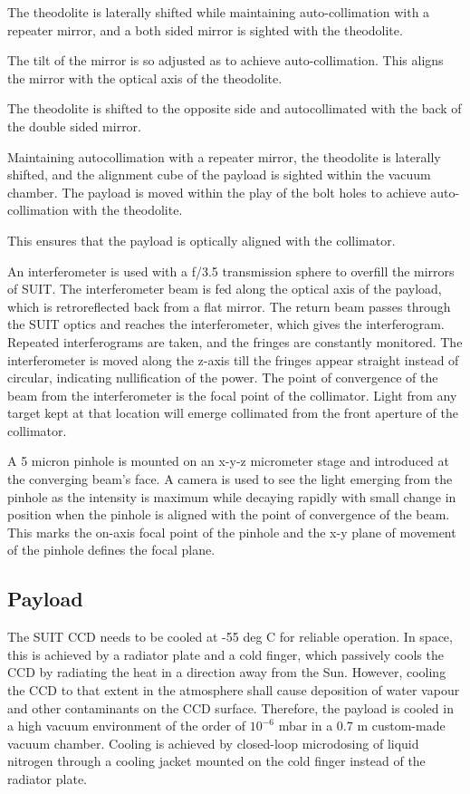 \documentclass[12pt]{spieman}  %
\begin{document}
	The theodolite is laterally shifted while maintaining auto-collimation with a repeater mirror, and a both sided mirror is sighted with the theodolite.
	
	The tilt of the mirror is so adjusted as to achieve auto-collimation. This aligns the mirror with the optical axis of the theodolite. 
	
	The theodolite is shifted to the opposite side and autocollimated with the back of the double sided mirror.
	
	Maintaining autocollimation with a repeater mirror, the theodolite is laterally shifted, and the alignment cube of the payload is sighted within the vacuum chamber. The payload is moved within the play of the bolt holes to achieve auto-collimation with the theodolite.
	
	This ensures that the payload is optically aligned with the collimator.
	
	An interferometer is used with a f/3.5 transmission sphere to overfill the mirrors of SUIT. The interferometer beam is fed along the optical axis of the payload, which is retroreflected back from a flat mirror. The return beam passes through the SUIT optics and reaches the interferometer, which gives the  interferogram. Repeated interferograms are taken, and the fringes are constantly monitored. The interferometer is moved along the z-axis till the fringes appear straight instead of circular, indicating nullification of the power. The point of convergence of the beam from the interferometer is the focal point of the collimator. Light from any target kept at that location will emerge collimated from the front aperture of the collimator. 
	
	A 5 micron pinhole is mounted on an x-y-z micrometer stage and introduced at the converging beam's face. A camera is used to see the light emerging from the pinhole as the intensity is maximum while decaying rapidly with small change in position when the pinhole is aligned with the point of convergence of the beam. This marks the on-axis focal point of the pinhole and the x-y plane of movement of the pinhole defines the focal plane.
	
	
	\subsection{Payload}
	The SUIT CCD needs to be cooled at -55 deg C for reliable operation. In space, this is achieved by a radiator plate and a cold finger, which passively cools the CCD by radiating the heat in a direction away from the Sun. However, cooling the CCD to that extent in the atmosphere shall cause deposition of water vapour and other contaminants on the CCD surface. Therefore, the payload is cooled in a high vacuum environment of the order of $10^{-6}$ mbar in a 0.7 m custom-made vacuum chamber. Cooling is achieved by closed-loop microdosing of liquid nitrogen through a cooling jacket mounted on the cold finger instead of the radiator plate.
	
\end{document}
